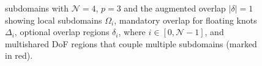 \begin{figure}[htbp]
%
	\caption{ subdomains with $\mathcal{N}=4$, $p=3$ and the augmented overlap $\left| \delta \right|=1$ showing local subdomains $\Omega_i$, mandatory overlap for floating knots $\Delta_i$, optional overlap regions $\delta_i$, where $i \in [0,\mathcal{N}-1]$, and multishared DoF regions that couple multiple subdomains (marked in red).}
	\label{fig:2d-schematic}
\end{figure}



%
%
%
%



